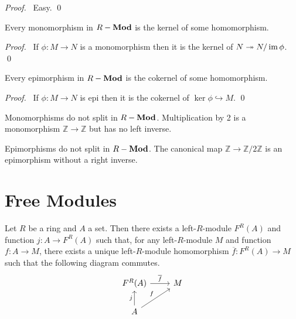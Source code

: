 \begin{proof}
\pf\ Easy. \qed
\end{proof}

\begin{prop}
Every monomorphism in ${R}-\mathbf{Mod}$ is the kernel of some homomorphism.
\end{prop}

\begin{proof}
\pf\ If $\phi : M \rightarrow N$ is a monomorphism then it is the kernel of $N \twoheadrightarrow N / \operatorname{im} \phi$. \qed
\end{proof}

\begin{prop}
Every epimorphism in ${R}-\mathbf{Mod}$ is the cokernel of some homomorphism.
\end{prop}

\begin{proof}
\pf\ If $\phi : M \rightarrow N$ is epi then it is the cokernel of $\ker \phi \hookrightarrow M$. \qed
\end{proof}

\begin{ex}
Monomorphisms do not split in ${R}-\mathbf{Mod}$. Multiplication by 2 is a monomorphism $\mathbb{Z} \rightarrow \mathbb{Z}$ but has no left inverse.
\end{ex}

\begin{ex}
Epimorphisms do not split in ${R}-\mathbf{Mod}$. The canonical map $\mathbb{Z} \rightarrow \mathbb{Z} / 2 \mathbb{Z}$ is an epimorphism without a right inverse.
\end{ex}

\section{Free Modules}

\begin{prop}
Let $R$ be a ring and $A$ a set. Then there exists a left-$R$-module $F^R(A)$ and function $j : A \rightarrow F^R(A)$ such that, for any left-$R$-module $M$ and function $f : A \rightarrow M$, there exists a unique left-$R$-module homomorphism $\overline{f} : F^R(A) \rightarrow M$ such that the following diagram commutes.
\[ \begin{tikzcd}
F^R(A) \arrow[r,"\overline{f}"] & M \\
A \arrow[u,"j"] \arrow[ur,"f"]
\end{tikzcd} \]
\end{prop}

